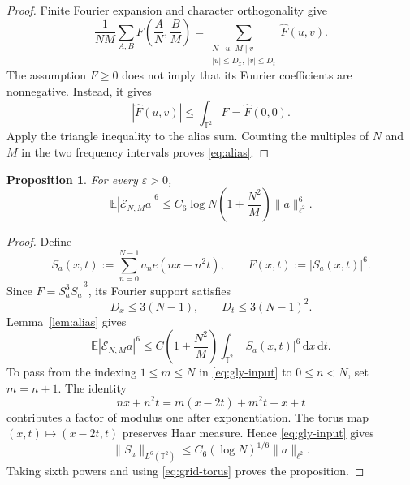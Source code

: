 \documentclass[11pt, twoside]{article}
\numberwithin{equation}{section}
\newtheorem{proposition}[theorem]{Proposition}
\theoremstyle{definition}
\newcommand{\T}{\mathbb T}
\newcommand{\E}{\mathbb E}
\newcommand{\cE}{\mathcal E}
\newcommand{\dd}{\,\mathrm d}
\begin{document}
\begin{proof}
Finite Fourier expansion and character orthogonality give
$$
\frac1{NM}\sum_{A,B}F\left(\frac AN,\frac BM\right)
=\sum_{\substack{N\mid u,\ M\mid v\\|u|\leq D_x,\ |v|\leq D_t}}\widehat F(u,v).
$$
The assumption $F\geq0$ does not imply that its Fourier coefficients are
nonnegative.  Instead, it gives
$$
\left|\widehat F(u,v)\right|\leq\int_{\T^2}F=\widehat F(0,0).
$$
Apply the triangle inequality to the alias sum.
Counting the multiples of $N$ and $M$ in the two frequency intervals proves
\eqref{eq:alias}.
\end{proof}

\begin{proposition}\label{prop:q2}
For every $\varepsilon>0$,
$$
\E|\cE_{N,M}a|^6\leq C_6\log N\left(1+\frac{N^2}{M}\right)\|a\|_{\ell^2}^6.
$$
\end{proposition}

\begin{proof}
Define
$$
S_a(x,t):=\sum_{n=0}^{N-1}a_ne(nx+n^2t),
\qquad
F(x,t):=|S_a(x,t)|^6.
$$
Since $F=S_a^3\overline{S_a}^{\,3}$, its Fourier support satisfies
$$
D_x\leq3(N-1),
\qquad
D_t\leq3(N-1)^2.
$$
Lemma~\ref{lem:alias} gives
\begin{equation}\label{eq:grid-torus}
\E|\cE_{N,M}a|^6
\leq
C\left(1+\frac{N^2}{M}\right)
\int_{\T^2}|S_a(x,t)|^6\dd x\dd t.
\end{equation}
To pass from the indexing $1\leq m\leq N$ in \eqref{eq:gly-input} to
$0\leq n<N$, set $m=n+1$.  The identity
$$
nx+n^2t=m(x-2t)+m^2t-x+t
$$
contributes a factor of modulus one after exponentiation.
The torus map $(x,t)\mapsto(x-2t,t)$ preserves Haar measure.  Hence
\eqref{eq:gly-input} gives
$$
\|S_a\|_{L^6(\T^2)}\leq C_6(\log N)^{1/6}\|a\|_{\ell^2}.
$$
Taking sixth powers and using \eqref{eq:grid-torus} proves the proposition.
\end{proof}
\end{document}
